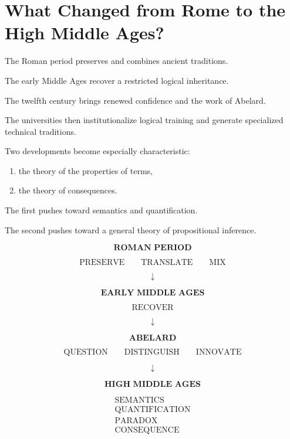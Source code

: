 \documentclass[11pt]{article}
\begin{document}
\section{What Changed from Rome to the High Middle Ages?}

The Roman period preserves and combines ancient traditions.

The early Middle Ages recover a restricted logical inheritance.

The twelfth century brings renewed confidence and the work of
Abelard.

The universities then institutionalize logical training and
generate specialized technical traditions.

Two developments become especially characteristic:

\begin{enumerate}
    \item the theory of the properties of terms,
    \item the theory of consequences.
\end{enumerate}

The first pushes toward semantics and quantification.

The second pushes toward a general theory of propositional
inference.

\begin{whiteboard}
\[
\textbf{ROMAN PERIOD}
\]

\[
\text{PRESERVE}
\qquad
\text{TRANSLATE}
\qquad
\text{MIX}
\]

\[
\downarrow
\]

\[
\textbf{EARLY MIDDLE AGES}
\]

\[
\text{RECOVER}
\]

\[
\downarrow
\]

\[
\textbf{ABELARD}
\]

\[
\text{QUESTION}
\qquad
\text{DISTINGUISH}
\qquad
\text{INNOVATE}
\]

\[
\downarrow
\]

\[
\textbf{HIGH MIDDLE AGES}
\]

\[
\begin{array}{c}
\text{SEMANTICS}\\
\text{QUANTIFICATION}\\
\text{PARADOX}\\
\text{CONSEQUENCE}
\end{array}
\]
\end{whiteboard}
\end{document}
